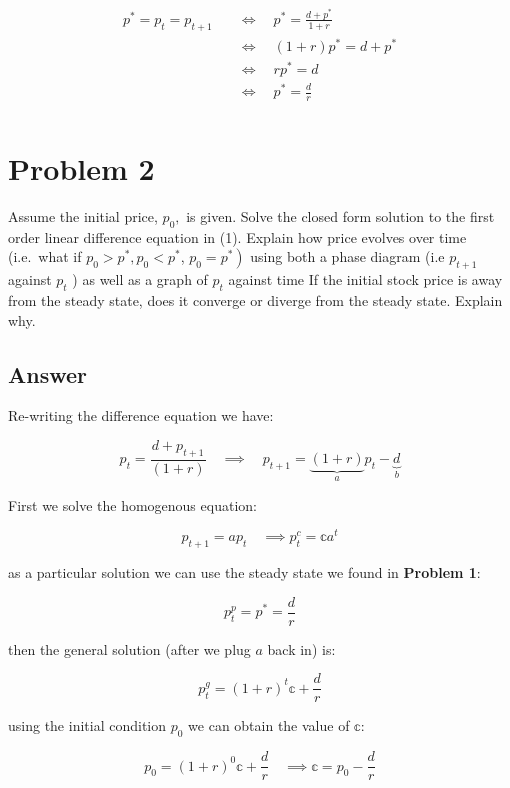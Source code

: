 \documentclass[10pt,notitlepage,onecolumn,aps,pra]{revtex4-1}
\begin{document}
\begin{align*}
    p^{*}=p_{t}=p_{t+1} &\quad \iff \quad  p^* = \frac{d + p^*}{1+r}\\
    &\quad \iff \quad (1+r)p^* =d + p^*\\
    &\quad \iff \quad rp^* =d\\
    &\quad \iff \quad \boxed{p^* =\frac{d}{r}}\\
\end{align*}

    \hypertarget{problem-2}{%
\section{Problem 2}\label{problem-2}}

Assume the initial price, \(p_{0},\) is given. Solve the closed form
solution to the first order linear difference equation in (1). Explain
how price evolves over time (i.e.~what if \(p_{0}>p^{*}, p_{0}<p^{*}\),
\(\left.p_{0}=p^{*}\right)\) using both a phase diagram (i.e \(p_{t+1}\)
against \(p_{t}\) ) as well as a graph of \(p_{t}\) against time If the
initial stock price is away from the steady state, does it converge or
diverge from the steady state. Explain why.

    \hypertarget{answer}{%
\subsection{Answer}\label{answer}}

Re-writing the difference equation we have:

\[p_{t}=\frac{d+p_{t+1}}{(1+r)} \quad \implies \quad p_{t+1}=\underbrace{(1+r)}_{a}p_t - \underbrace{d}_{b} \]

First we solve the homogenous equation:

\[p_{t+1} = a p_{t} \quad \implies p^c_t = \mathbb{c} a^t \]

as a particular solution we can use the steady state we found in
\textbf{Problem 1}:

\[p_t^{p} = p^* =\frac{d}{r}\]

then the general solution (after we plug \(a\) back in) is:

\[p^g_t = (1+r)^t \mathbb{c} + \frac{d}{r}\]

using the initial condition \(p_0\) we can obtain the value of
\(\mathbb{c}\):

\[p_0 = (1+r)^0 \mathbb{c} + \frac{d}{r} \quad \implies \mathbb{c} = p_0 - \frac{d}{r}\]
\end{document}
